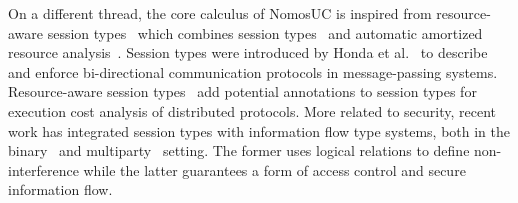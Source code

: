 On a different thread, the core calculus of NomosUC is inspired from resource-aware session types~\cite{das2018work} which combines
session types~\cite{HondaCONCUR1993, HondaESOP1998, HondaPOPL2008,caires2010session, ToninhoESOP2013, PfenningFOSSACS2015,
WadlerICFP2012} and automatic amortized resource analysis~\cite{Hofmann03AARA,HoffmannW15}.
Session types were introduced by Honda et al.~\cite{HondaCONCUR1993} to describe and enforce bi-directional communication protocols
in message-passing systems.
Resource-aware session types~\cite{das2018work} add potential annotations to session types for execution cost analysis
of distributed protocols.
More related to security, recent work has integrated session types with information flow type systems, both
in the binary~\cite{Derakhshan21LICS} and multiparty~\cite{Capecchi10CONCUR} setting.
The former uses logical relations to define non-interference while the latter
guarantees a form of access control and secure information flow.

%

